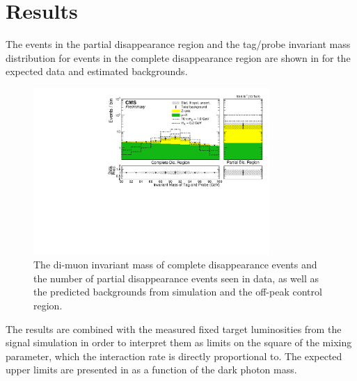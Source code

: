 \chapter{Results}
\label{results}

The events in the partial disappearance region and the tag/probe invariant mass distribution for events in the complete disappearance region are shown in  for the expected data and estimated backgrounds.

\begin{figure}[htbp]
	\centering
	\includegraphics[width=0.8\textwidth]{figures/bdtScore_partialDisappearanceBDT_0p2.pdf}
	\caption[Observed Signal Region Events]{The di-muon invariant mass of complete disappearance events and the number of partial disappearance events seen in data, as well as the predicted backgrounds from simulation and the off-peak control region.}
	\label{fig:invMassResult}
\end{figure}

The results are combined with the measured fixed target luminosities from the signal simulation in order to interpret them as limits on the square of the mixing parameter, which the \dbrem interaction rate is directly proportional to.
The expected upper limits are presented in  as a function of the dark photon mass. 

